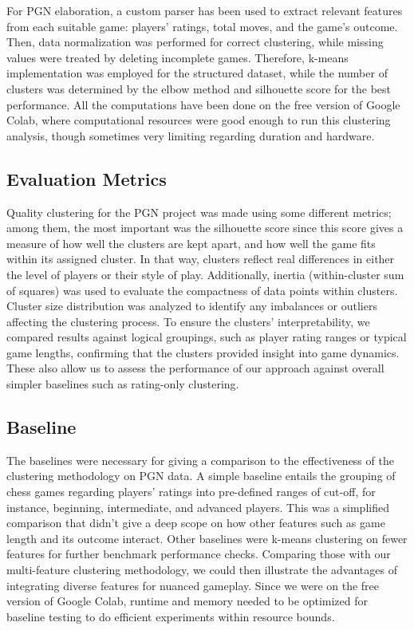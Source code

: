 \documentclass[conference]{IEEEtran}
\begin{document}
For PGN elaboration, a custom parser has been used to extract relevant features from each suitable game: players' ratings, total moves, and the game's outcome. Then, data normalization was performed for correct clustering, while missing values were treated by deleting incomplete games. Therefore, k-means implementation was employed for the structured dataset, while the number of clusters was determined by the elbow method and silhouette score for the best performance. All the computations have been done on the free version of Google Colab, where computational resources were good enough to run this clustering analysis, though sometimes very limiting regarding duration and hardware.

\subsection{Evaluation Metrics}
Quality clustering for the PGN project was made using some different metrics; among them, the most important was the silhouette score since this score gives a measure of how well the clusters are kept apart, and how well the game fits within its assigned cluster. In that way, clusters reflect real differences in either the level of players or their style of play. Additionally, inertia (within-cluster sum of squares) was used to evaluate the compactness of data points within clusters. Cluster size distribution was analyzed to identify any imbalances or outliers affecting the clustering process. To ensure the clusters' interpretability, we compared results against logical groupings, such as player rating ranges or typical game lengths, confirming that the clusters provided insight into game dynamics. These also allow us to assess the performance of our approach against overall simpler baselines such as rating-only clustering.

\subsection{Baseline}
The baselines were necessary for giving a comparison to the effectiveness of the clustering methodology on PGN data. A simple baseline entails the grouping of chess games regarding players' ratings into pre-defined ranges of cut-off, for instance, beginning, intermediate, and advanced players. This was a simplified comparison that didn't give a deep scope on how other features such as game length and its outcome interact. Other baselines were k-means clustering on fewer features for further benchmark performance checks. Comparing those with our multi-feature clustering methodology, we could then illustrate the advantages of integrating diverse features for nuanced gameplay. Since we were on the free version of Google Colab, runtime and memory needed to be optimized for baseline testing to do efficient experiments within resource bounds.
\end{document}
